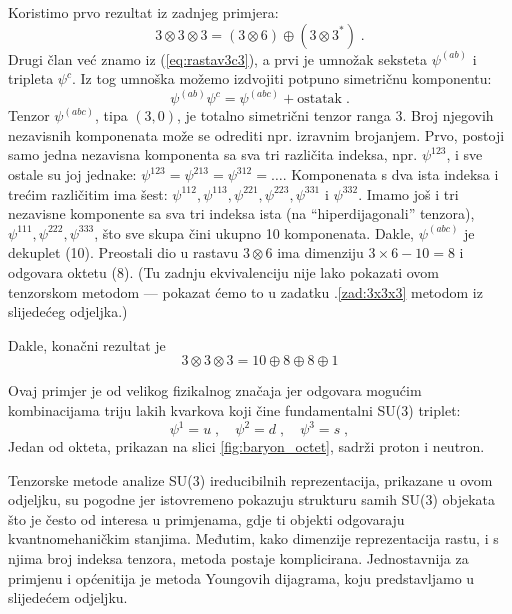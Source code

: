 \begin{primjer}
Koristimo prvo rezultat iz zadnjeg primjera:
\begin{equation}
3\otimes 3\otimes 3 = (3 \otimes 6) \oplus (3 \otimes 3^*) \;.
\end{equation}
Drugi član već znamo iz (\ref{eq:rastav3c3}), a prvi je
umnožak seksteta $\psi^{(ab)}$ i tripleta $\psi^{c}$.
Iz tog umnoška možemo izdvojiti potpuno simetričnu komponentu:
\begin{equation}
\psi^{(ab)}\psi^{c} = \psi^{(abc)} + \text{ostatak} \;. 
\label{eq:6x3}
\end{equation}
Tenzor $\psi^{(abc)}$, tipa $(3,0)$, je totalno simetrični
tenzor ranga 3. Broj njegovih nezavisnih komponenata može
se odrediti npr. izravnim brojanjem. Prvo, postoji
samo jedna nezavisna komponenta sa sva tri različita
indeksa, npr. $\psi^{123}$, i sve ostale su joj jednake:
$\psi^{123} = \psi^{213} = \psi^{312} = \ldots$. Komponenata
s dva ista indeksa i trećim različitim ima šest:
$\psi^{112}, \psi^{113}, \psi^{221}, \psi^{223},
\psi^{331}$ i $\psi^{332}$. Imamo još i tri nezavisne
komponente sa sva tri indeksa ista (na ``hiperdijagonali''
tenzora), $\psi^{111}, \psi^{222}, \psi^{333}$, što sve skupa
čini ukupno 10 komponenata. Dakle, $\psi^{(abc)}$ je
dekuplet (10). Preostali dio u rastavu $3 \otimes 6$ ima
dimenziju $3\times6-10=8$ i odgovara oktetu (8). (Tu
zadnju ekvivalenciju nije lako pokazati ovom tenzorskom
metodom --- pokazat ćemo to u zadatku \thechapter.\ref{zad:3x3x3} 
metodom iz slijedećeg odjeljka.)

Dakle, konačni rezultat je
\begin{equation}
 3 \otimes 3 \otimes 3 = 10 \oplus 8 \oplus 8 \oplus 1
\label{eq:3x3x3}
\end{equation}

Ovaj primjer je od velikog fizikalnog značaja jer odgovara
mogućim kombinacijama triju lakih kvarkova koji čine
fundamentalni SU(3) triplet:
\begin{equation}
 \psi^{1}=u\;, \quad \psi^{2}=d \;, \quad \psi^{3} = s \;,
\end{equation}
Jedan od okteta, prikazan na slici \ref{fig:baryon_octet}, sadrži 
proton i neutron.
\end{primjer}

Tenzorske metode analize SU(3) ireducibilnih reprezentacija, prikazane
u ovom odjeljku, su pogodne jer istovremeno pokazuju strukturu samih
SU(3) objekata što je često od interesa u primjenama, gdje ti objekti
odgovaraju kvantnomehaničkim stanjima. Međutim, kako
dimenzije reprezentacija rastu, i s njima broj indeksa tenzora,
metoda postaje komplicirana. Jednostavnija za primjenu i općenitija
je metoda Youngovih dijagrama, koju predstavljamo u 
slijedećem odjeljku.


